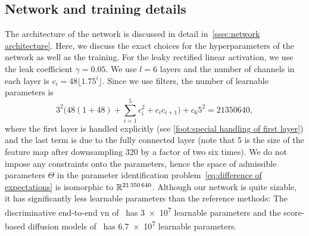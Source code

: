 \subsection{Network and training details}
The architecture of the network is discussed in detail in~\cref{ssec:network architecture}.
Here, we discuss the exact choices for the hyperparameters of the network as well as the training.
For the leaky rectified linear activation, we use the leak coefficient \( \gamma = \num{0.05} \).
We use \( l = \num{6} \) layers and the number of channels in each layer is \( c_i = \num{48} \lfloor \num{1.75}^{i} \rfloor \).
Since we use  filters, the number of learnable parameters is
\begin{equation}
	\num{3}^{\num{2}} \bigl(\num{48}(\num{1} + \num{48}) +\sum_{i=\num{1}}^5 c_i^{\num{2}} + c_i c_{i+1}\bigr) + c_{\num{6}} \num{5}^{\num{2}} = \num{21350640},
\end{equation}
where the first layer is handled explicitly (see \cref{foot:special handling of first layer}) and the last term is due to the fully connected layer (note that \num{5} is the size of the feature map after downsampling 320 by a factor of two six times).
We do not impose any constraints onto the parameters, hence the space of admissible parameters \( \Theta \) in the parameter identification problem~\cref{eq:difference of expectations} is isomorphic to \( \mathbb{R}^{\num{21350640}} \).
Although our network is quite sizable, it has significantly less learnable parameters than the reference methods:
The discriminative end-to-end \gls{vn} of~\cite{sriram_endtoend_2020} has \num{3e7} learnable parameters and the score-based diffusion models of~\cite{chung_scoremri_2022} has \num{6.7e7} learnable parameters.%

